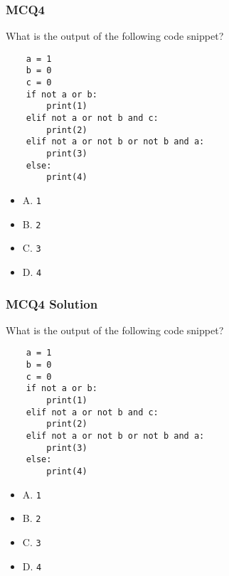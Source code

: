 \documentclass{beamer}
\begin{document}
\begin{frame}[fragile]
    \frametitle{MCQ4}
    What is the output of the following code snippet?
    \begin{verbatim}
    a = 1
    b = 0
    c = 0
    if not a or b:
        print(1)
    elif not a or not b and c:
        print(2)
    elif not a or not b or not b and a:
        print(3)
    else:
        print(4)
    \end{verbatim}
    \begin{itemize}
        \item A. \texttt{1}
        \item B. \texttt{2}
        \item C. \texttt{3}
        \item D. \texttt{4}
    \end{itemize}
\end{frame}
\begin{frame}[fragile]
    \frametitle{MCQ4 Solution}
    What is the output of the following code snippet?
    \begin{verbatim}
    a = 1
    b = 0
    c = 0
    if not a or b:
        print(1)
    elif not a or not b and c:
        print(2)
    elif not a or not b or not b and a:
        print(3)
    else:
        print(4)
    \end{verbatim}
    \begin{itemize}
        \item A. \texttt{1}
        \item B. \texttt{2}
        \item \alert{C. \texttt{3}}
        \item D. \texttt{4}
    \end{itemize}
\end{frame}
\end{document}
